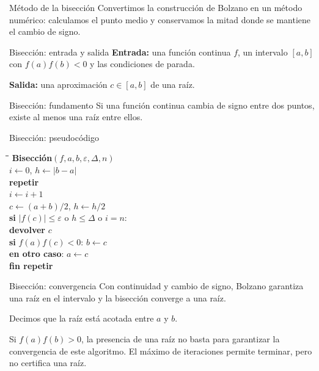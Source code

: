 \documentclass[original_version/main.tex]{subfiles}
\begin{document}
\begin{frame}{Método de la bisección}
Convertimos la construcción de Bolzano en un método numérico: calculamos el punto medio y conservamos la mitad donde se mantiene el cambio de signo.
\end{frame}

\begin{frame}{Bisección: entrada y salida}
\textbf{Entrada:} una función continua $f$, un intervalo $[a,b]$ con $f(a)f(b)<0$ y las condiciones de parada.\par\medskip\textbf{Salida:} una aproximación $c\in[a,b]$ de una raíz.
\end{frame}

\begin{frame}{Bisección: fundamento}
Si una función continua cambia de signo entre dos puntos, existe al menos una raíz entre ellos.
\end{frame}

\begin{frame}{Bisección: pseudocódigo}
\footnotesize\begin{tabbing}\hspace{4mm}\=\hspace{5mm}\=\hspace{5mm}\=\kill
\textbf{Bisección}$(f,a,b,\varepsilon,\Delta,n)$\\
$i\gets0$, $h\gets|b-a|$\\
\textbf{repetir}\\
\>$i\gets i+1$\\
\>$c\gets(a+b)/2$, $h\gets h/2$\\
\>\textbf{si} $|f(c)|\le\varepsilon$ o $h\le\Delta$ o $i=n$:\\
\>\>\textbf{devolver} $c$\\
\>\textbf{si} $f(a)f(c)<0$: $b\gets c$\\
\>\textbf{en otro caso}: $a\gets c$\\
\textbf{fin repetir}
\end{tabbing}
\end{frame}

\begin{frame}{Bisección: convergencia}
Con continuidad y cambio de signo, Bolzano garantiza una raíz en el intervalo y la bisección converge a una raíz.\par\medskip Decimos que la raíz está acotada entre $a$ y $b$.\par\medskip Si $f(a)f(b)>0$, la presencia de una raíz no basta para garantizar la convergencia de este algoritmo. El máximo de iteraciones permite terminar, pero no certifica una raíz.
\end{frame}
\end{document}
